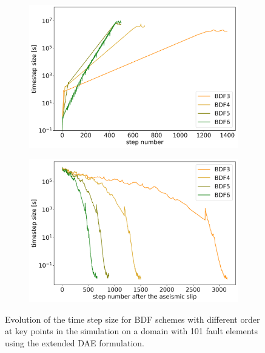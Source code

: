 \begin{figure}[H]
	\centering
	\begin{subfigure}[b]{0.45\textwidth}
		\centering
		\includegraphics[width=1\textwidth]{images/TANDEMTimeAnalysisDifferentBDFOrdersLagrange_ExtendedDAE_Size101_Init.png}
		\label{fig:BDFOrders_extended_DAE_compare_initialization}
	\end{subfigure}
	\begin{subfigure}[b]{0.45\textwidth}
		\centering
		\includegraphics[width=1\textwidth]{images/TANDEMTimeAnalysisDifferentBDFOrdersLagrange_ExtendedDAE_Size101_Begin1stEQ.png}
		\label{fig:BDFOrders_extended_DAE_compare_begin_first_EQ}
	\end{subfigure}
	\caption{Evolution of the time step size for BDF schemes with different order at key points in the simulation on a domain with 101 fault elements using the extended DAE formulation.}
\end{figure}

